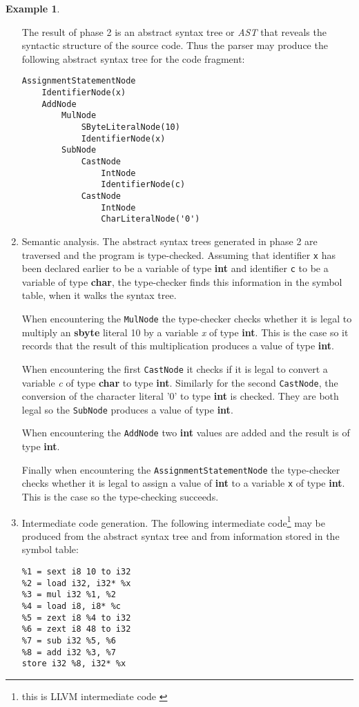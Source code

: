 \documentclass[a4paper,oneside,11pt]{book}
\theoremstyle{definition}
\newtheorem{exmp}{Example}[section]
\begin{document}
\begin{exmp}
\begin{enumerate}
The result of phase 2 is an abstract syntax tree or \emph{AST} that reveals
the syntactic structure of the source code.
Thus the parser may produce the following abstract syntax tree for the code fragment:

\begin{verbatim}
AssignmentStatementNode
    IdentifierNode(x)
    AddNode
        MulNode
            SByteLiteralNode(10)
            IdentifierNode(x)
        SubNode
            CastNode
                IntNode
                IdentifierNode(c)
            CastNode
                IntNode
                CharLiteralNode('0')
\end{verbatim}

\item
Semantic analysis. The abstract syntax trees generated in phase 2 are traversed and the
program is type-checked.
Assuming that identifier \verb|x| has been declared earlier to be a variable of type \textbf{int} and
identifier \verb|c| to be a variable of type \textbf{char},
the type-checker finds this information in the symbol table, when it walks the syntax tree.

When encountering the \verb|MulNode| the type-checker checks whether it is legal to multiply an \textbf{sbyte} literal 10 by
a variable \emph{x} of type \textbf{int}. This is the case so it records that the result of this multiplication produces a value
of type \textbf{int}.

When encountering the first \verb|CastNode| it checks if it is legal to convert a variable \emph{c} of type \textbf{char} to type \textbf{int}.
Similarly for the second \verb|CastNode|, the conversion of the character literal '0' to type \textbf{int} is checked.
They are both legal so the \verb|SubNode| produces a value of type \textbf{int}.

When encountering the \verb|AddNode| two \textbf{int} values are added and the result is of type \textbf{int}.

Finally when encountering the \verb|AssignmentStatementNode| the type-checker checks whether it is legal to assign a value of \textbf{int}
to a variable \verb|x| of type \textbf{int}. This is the case so the type-checking succeeds.

\item
Intermediate code generation.
The following intermediate code\footnote{this is LLVM intermediate code \cite{LLVM}}
may be produced from the abstract syntax tree and from information stored in the symbol table:

\begin{verbatim}
%1 = sext i8 10 to i32
%2 = load i32, i32* %x
%3 = mul i32 %1, %2
%4 = load i8, i8* %c
%5 = zext i8 %4 to i32
%6 = zext i8 48 to i32
%7 = sub i32 %5, %6
%8 = add i32 %3, %7
store i32 %8, i32* %x
\end{verbatim}


\end{enumerate}
\end{exmp}
\end{document}
